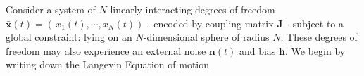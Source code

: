 Consider a system of $N$ linearly interacting degrees of freedom $\mathbf{\bar x}(t) = \left(\,x_1(t),\cdots, x_N(t)\right)$ - encoded by coupling matrix $\mathbf{J}$ - subject to a global constraint: lying on an $N$-dimensional sphere of radius $N$. These degrees of freedom may also experience an external noise $\mathbf{n}(t)$ and bias $\mathbf{h}$. We begin by writing down the Langevin Equation of motion